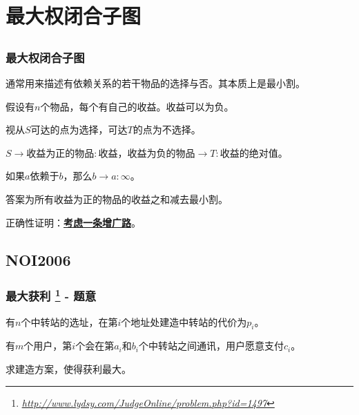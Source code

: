 \documentclass[9pt,dvipsnames,table]{beamer}
\newcommand{\hlink}[1]{
	\footnote{\fontsize{6pt}{\baselineskip}\href{#1}{\textsl{\underline{#1}}}}
}
\begin{document}
\section[Model III]{最大权闭合子图}
\subsection{}
\begin{frame}
	\frametitle{最大权闭合子图}
	通常用来描述有依赖关系的若干物品的选择与否。其本质上是最小割。
	
	假设有$n$个物品，每个有自己的收益。收益可以为负。\pause
	
	视从$S$可达的点为选择，可达$T$的点为不选择。
	
	$S\rightarrow$收益为正的物品$:$收益，收益为负的物品$\rightarrow T:$收益的绝对值。
	
	如果$a$依赖于$b$，那么$b\rightarrow a:\infty$。
	
	答案为所有收益为正的物品的收益之和减去最小割。\pause
	
	正确性证明：\underline{\textbf{考虑一条增广路}}。
\end{frame}

\subsection{NOI2006}
\begin{frame}
	\frametitle{最大获利\hlink{http://www.lydsy.com/JudgeOnline/problem.php?id=1497} - 题意}
	有$n$个中转站的选址，在第$i$个地址处建造中转站的代价为$p_i$。
	
	有$m$个用户，第$i$个会在第$a_i$和$b_i$个中转站之间通讯，用户愿意支付$c_i$。
	
	求建造方案，使得获利最大。
\end{frame}
\end{document}
